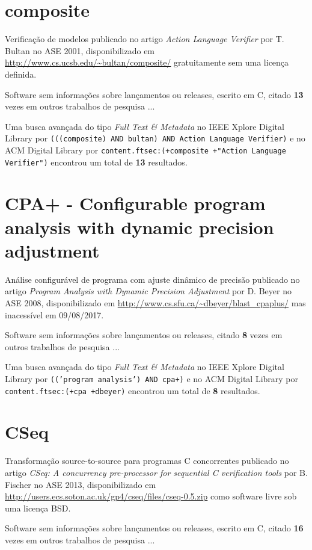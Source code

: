 \section{composite}

Verificação de modelos
publicado no artigo {\it Action Language Verifier}
por T. Bultan
no ASE 2001,
disponibilizado em \url{http://www.cs.ucsb.edu/~bultan/composite/}
gratuitamente
sem uma licença definida.

Software sem informações sobre lançamentos ou releases,
escrito em C,
citado {\bf 13} vezes em outros trabalhos de pesquisa ...

Uma busca avançada do tipo {\it Full Text \& Metadata} no IEEE Xplore Digital Library por
\texttt{(((composite) AND bultan) AND Action Language Verifier)}
e no ACM Digital Library por
\texttt{content.ftsec:(+composite +"Action Language Verifier")}
encontrou um total de
{\bf 13}
resultados.

\section{CPA+ - Configurable program analysis with dynamic precision adjustment}

Análise configurável de programa com ajuste dinâmico de precisão
publicado no artigo {\it Program Analysis with Dynamic Precision Adjustment}
por D. Beyer
no ASE 2008,
disponibilizado em \url{http://www.cs.sfu.ca/~dbeyer/blast_cpaplus/}
mas inacessível em 09/08/2017.

Software sem informações sobre lançamentos ou releases,
citado {\bf 8} vezes em outros trabalhos de pesquisa ...

Uma busca avançada do tipo {\it Full Text \& Metadata} no IEEE Xplore Digital Library por
\texttt{(('program analysis') AND cpa+)}
e no ACM Digital Library por
\texttt{content.ftsec:(+cpa +dbeyer)}
encontrou um total de
{\bf 8}
resultados.

\section{CSeq}

Transformação source-to-source para programas C concorrentes
publicado no artigo {\it CSeq: A concurrency pre-processor for sequential C verification tools}
por B. Fischer
no ASE 2013,
disponibilizado em \url{http://users.ecs.soton.ac.uk/gp4/cseq/files/cseq-0.5.zip}
como software livre
sob uma licença BSD.

Software sem informações sobre lançamentos ou releases,
escrito em C,
citado {\bf 16} vezes em outros trabalhos de pesquisa ...

